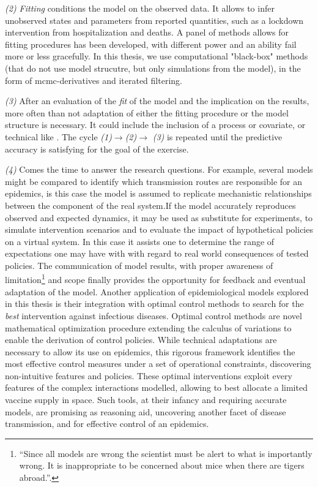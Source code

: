 \textit{(2) Fitting} conditions the model on the observed data. It allows to infer unobserved states and parameters from reported quantities, such as a lockdown intervention from hospitalization and deaths. A panel of methods allows for fitting procedures has been developed, with different power and an ability fail more or less gracefully. In this thesis, we use computational "black-box" methods (that do not use model strucutre, but only simulations from the model), in the form of mcmc-derivatives and iterated filtering.

\textit{(3)} After an evaluation of the \textit{fit} of the model and the implication on the results, more often than not adaptation of either the fitting procedure or the model structure is necessary. It could include the inclusion of a process or covariate, or technical like . The cycle \textit{(1)}$\rightarrow$\textit{(2)}$\rightarrow$ \textit{(3)} is repeated until the predictive accuracy is satisfying for the goal of the exercise.

\textit{(4)} Comes the time to answer the research questions. For example, several models might be compared to identify which transmission routes are responsible for an epidemics, is this case the model is assumed to replicate mechanistic relationships between the component of the real system.If the model accurately reproduces observed and expected dynamics, it may be used as substitute for experiments, to simulate intervention scenarios and to evaluate the impact of hypothetical policies on a virtual system. In this case it assists one to determine the range of expectations one may have with with regard to real world consequences of tested policies. The communication of model results, with proper awareness of limitation\footnote[][5\baselineskip]{“Since all models are wrong the scientist must be alert to what is importantly wrong. It is inappropriate to be concerned about mice when there are tigers abroad.”.}
 and scope finally provides the opportunity for feedback and eventual adaptation of the model\cite{Heesterbeek:ModelingInfectiousDisease:2015}. Another application of epidemiological models explored in this thesis is their integration with optimal control methods to search for the \textit{best} intervention against infectious diseases. Optimal control methods are novel mathematical optimization procedure extending the calculus of variations to enable the derivation of control policies. While technical adaptations are necessary to allow its use on epidemics, this rigorous framework identifies the most effective control measures under a set of operational constraints, discovering non-intuitive features and policies. These optimal interventions exploit every features of the complex interactions modelled, allowing to \eg best allocate a limited vaccine supply in space. Such tools, at their infancy and requiring accurate models, are promising as reasoning aid, uncovering another facet of disease transmission, and for effective control of an epidemics.

